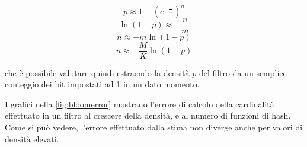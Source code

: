 $$ p \approx 1-(e^{-\frac{1}{m}})^n $$
$$ \ln(1-p) \approx -\frac{n}{m} $$
$$ n \approx -m\ln(1-p) $$
\begin{equation} \label{eq:bloomcard}
n \approx -\frac{M}{K}\ln(1-p)
\end{equation}

che è possibile valutare quindi estraendo la densità $p$ del filtro da un semplice conteggio
dei bit impostati ad 1 in un dato momento.

I grafici nella \autoref{fig:bloomerror} mostrano l'errore di calcolo della cardinalità
effettuato in un filtro al crescere della densità, e al numero di funzioni di hash. Come si può
vedere, l'errore effettuato dalla stima non diverge anche per valori di densità elevati.

\begin{figure}
	\centering
	\begin{minipage}[c]{0.7\textwidth}
	\end{minipage}
	\qquad
	\begin{minipage}[c]{0.7\textwidth}
\end{minipage}
\end{figure}
